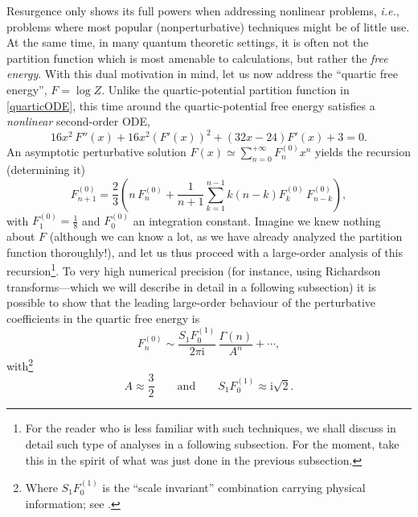 \documentclass[11pt,a4paper]{article}
\newcommand{\be}{\begin{equation}}
\newcommand{\ee}{\end{equation}}
\newcommand{\rmi}{{\mathrm{i}}}
\begin{document}
Resurgence only shows its full powers when addressing nonlinear problems, \textit{i.e.}, problems where most popular (nonperturbative) techniques might be of little use. At the same time, in many quantum theoretic settings, it is often not the partition function which is most amenable to calculations, but rather the \textit{free energy}. With this dual motivation in mind, let us now address the ``quartic free energy'', $F = \log Z$. Unlike the quartic-potential partition function in \eqref{quarticODE}, this time around the quartic-potential free energy satisfies a \textit{nonlinear} second-order ODE,
%
\be
\label{quarticNLODE}
16 x^2\, F'' (x) + 16 x^2 \left( F'(x) \right)^2 + \left( 32 x - 24 \right) F' (x) + 3 = 0.
\ee
%
\noindent
An asymptotic perturbative solution $F (x) \simeq \sum_{n=0}^{+\infty} F_n^{(0)} x^n$ yields the recursion (determining it)
%
\be\label{quarticFrecursion}
F_{n+1}^{(0)} = \frac{2}{3} \left( n\, F_n^{(0)} + \frac{1}{n+1} \sum_{k=1}^{n-1} k \left(n-k\right) F_k^{(0)}\, F_{n-k}^{(0)} \right),
\ee
%
\noindent
with $F_1^{(0)} = \frac{1}{8}$ and $F_0^{(0)}$ an integration constant. Imagine we knew nothing about $F$ (although we can know a lot, as we have already analyzed the partition function thoroughly!), and let us thus proceed with a large-order analysis of this recursion\footnote{For the reader who is less familiar with such techniques, we shall discuss in detail such type of analyses in a following subsection. For the moment, take this in the spirit of what was just done in the previous subsection.}. To very high numerical precision (for instance, using Richardson transforms---which we will describe in detail in a following subsection) it is possible to show that the leading large-order behaviour of the perturbative coefficients in the quartic free energy is 
%
\be
\label{quarticFdivergesn!}
F^{(0)}_n \sim \frac{S_1 F^{(1)}_0}{2\pi\rmi}\, \frac{\Gamma \left( n \right)}{A^n} + \cdots,
\ee
%
\noindent
with\footnote{Where $S_1 F^{(1)}_0$ is the ``scale invariant'' combination carrying physical information; see \cite{asv11}.}
%
\be
\label{freeen-initial-large-order}
A \approx \frac{3}{2} \qquad \text{and} \qquad S_1 F^{(1)}_0 \approx \rmi \sqrt{2}.
\ee
\end{document}
